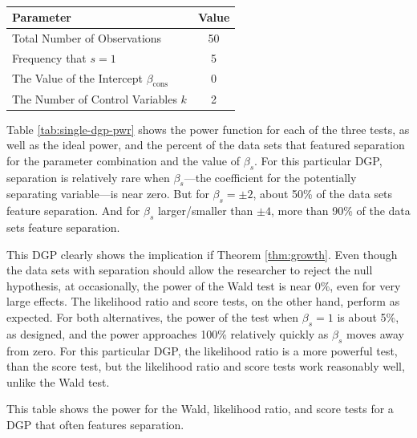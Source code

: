 \documentclass[
]{article}
\begin{document}
\renewcommand{\captiontext}{}
\renewcommand{\notetext}{}
\begin{table}[!h]
\caption{\label{tab:single-dgp-pars}}
\centering
\fontsize{10}{12}\selectfont
\begin{threeparttable}
\begin{tabular}{lc}
\toprule
Parameter & Value        \\
\midrule
Total Number of Observations & 50 \\
Frequency that $s = 1$    &   5 \\
The Value of the Intercept $\beta_{\text{cons}}$ & 0 \\
The Number of Control Variables $k$ & 2 \\
\bottomrule
\end{tabular}\begin{tablenotes}[para]

\end{tablenotes}
\end{threeparttable}
\end{table}

Table \ref{tab:single-dgp-pwr} shows the power function for each of the
three tests, as well as the ideal power, and the percent of the data
sets that featured separation for the parameter combination and the
value of \(\beta_s\). For this particular DGP, separation is relatively
rare when \(\beta_s\)---the coefficient for the potentially separating
variable---is near zero. But for \(\beta_s = \pm 2\), about 50\% of the
data sets feature separation. And for \(\beta_s\) larger/smaller than
\(\pm 4\), more than 90\% of the data sets feature separation.

This DGP clearly shows the implication if Theorem \ref{thm:growth}. Even
though the data sets with separation should allow the researcher to
reject the null hypothesis, at occasionally, the power of the Wald test
is near 0\%, even for very large effects. The likelihood ratio and score
tests, on the other hand, perform as expected. For both alternatives,
the power of the test when \(\beta_s = 1\) is about 5\%, as designed,
and the power approaches 100\% relatively quickly as \(\beta_s\) moves
away from zero. For this particular DGP, the likelihood ratio is a more
powerful test, than the score test, but the likelihood ratio and score
tests work reasonably well, unlike the Wald test.

\renewcommand{\captiontext}{}
\renewcommand{\notetext}{This table shows the power for the Wald, likelihood ratio, and score tests for a DGP that often features separation.}
\begin{table}[!h]
\caption{\label{tab:single-dgp-pwr}}
\centering
\fontsize{10}{12}\selectfont
\begin{threeparttable}
   
\begin{tablenotes}[para]
This table shows the power for the Wald, likelihood ratio, and score tests for a DGP that often features separation.
\end{tablenotes}
\end{threeparttable}
\end{table}
\end{document}
